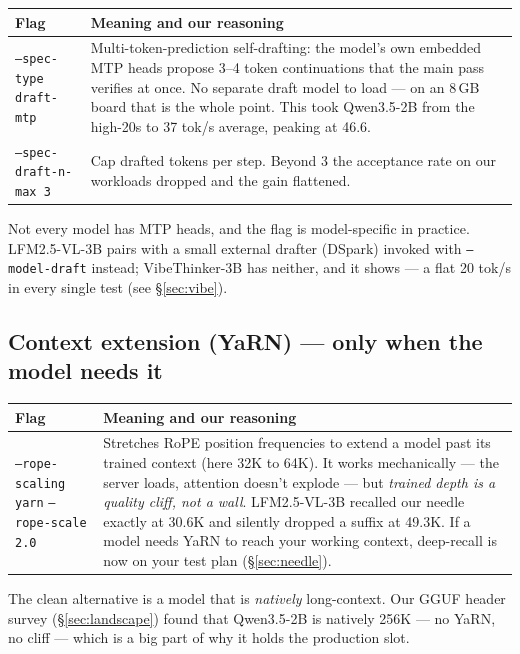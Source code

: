 \documentclass[11pt,a4paper]{article}
\newcommand{\flag}[1]{\texttt{\textcolor{flagcolour}{#1}}}
\begin{document}
\begin{center}
\small
\begin{tabularx}{\textwidth}{L{4.6cm} X}
\toprule
\textbf{Flag} & \textbf{Meaning and our reasoning} \\
\midrule
\flag{--spec-type draft-mtp} & Multi-token-prediction self-drafting: the model's own embedded MTP heads propose 3--4 token continuations that the main pass verifies at once. No separate draft model to load --- on an 8\,GB board that is the whole point. This took Qwen3.5-2B from the high-20s to 37 tok/s average, peaking at 46.6. \\
\flag{--spec-draft-n-max 3} & Cap drafted tokens per step. Beyond 3 the acceptance rate on our workloads dropped and the gain flattened. \\
\bottomrule
\end{tabularx}
\end{center}

Not every model has MTP heads, and the flag is model-specific in practice.
LFM2.5-VL-3B pairs with a small external drafter (DSpark) invoked with
\flag{--model-draft} instead; VibeThinker-3B has neither, and it shows ---
a flat 20 tok/s in every single test (see \S\ref{sec:vibe}).

\subsection{Context extension (YaRN) --- only when the model needs it}

\begin{center}
\small
\begin{tabularx}{\textwidth}{L{4.6cm} X}
\toprule
\textbf{Flag} & \textbf{Meaning and our reasoning} \\
\midrule
\flag{--rope-scaling yarn} \newline \flag{--rope-scale 2.0} & Stretches RoPE position frequencies to extend a model past its trained context (here 32K to 64K). It works mechanically --- the server loads, attention doesn't explode --- but \emph{trained depth is a quality cliff, not a wall}. LFM2.5-VL-3B recalled our needle exactly at 30.6K and silently dropped a suffix at 49.3K. If a model needs YaRN to reach your working context, deep-recall is now on your test plan (\S\ref{sec:needle}). \\
\bottomrule
\end{tabularx}
\end{center}

The clean alternative is a model that is \emph{natively} long-context. Our
GGUF header survey (\S\ref{sec:landscape}) found that Qwen3.5-2B is natively
256K --- no YaRN, no cliff --- which is a big part of why it holds the
production slot.
\end{document}
